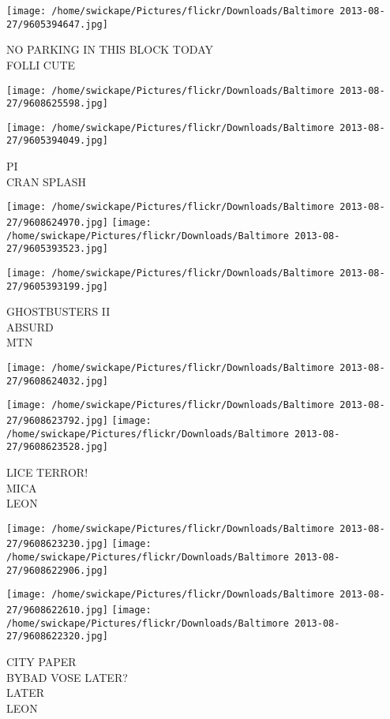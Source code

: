 \documentclass[10pt,letterpaper]{article}
\begin{document}
\vspace{0.25in}
\texttt{[image: /home/swickape/Pictures/flickr/Downloads/Baltimore 2013-08-27/9605394647.jpg]}

NO PARKING IN THIS BLOCK TODAY\\
FOLLI CUTE
\pagebreak

\texttt{[image: /home/swickape/Pictures/flickr/Downloads/Baltimore 2013-08-27/9608625598.jpg]}

\vspace{0.25in}
\texttt{[image: /home/swickape/Pictures/flickr/Downloads/Baltimore 2013-08-27/9605394049.jpg]}

PI\\
CRAN SPLASH
\pagebreak

\texttt{[image: /home/swickape/Pictures/flickr/Downloads/Baltimore 2013-08-27/9608624970.jpg]}
\texttt{[image: /home/swickape/Pictures/flickr/Downloads/Baltimore 2013-08-27/9605393523.jpg]}

\texttt{[image: /home/swickape/Pictures/flickr/Downloads/Baltimore 2013-08-27/9605393199.jpg]}

GHOSTBUSTERS II\\
ABSURD\\
MTN
\pagebreak

\texttt{[image: /home/swickape/Pictures/flickr/Downloads/Baltimore 2013-08-27/9608624032.jpg]}

\vspace{0.25in}
\texttt{[image: /home/swickape/Pictures/flickr/Downloads/Baltimore 2013-08-27/9608623792.jpg]}
\texttt{[image: /home/swickape/Pictures/flickr/Downloads/Baltimore 2013-08-27/9608623528.jpg]}

LICE TERROR!\\
MICA\\
LEON
\pagebreak

\texttt{[image: /home/swickape/Pictures/flickr/Downloads/Baltimore 2013-08-27/9608623230.jpg]}
\texttt{[image: /home/swickape/Pictures/flickr/Downloads/Baltimore 2013-08-27/9608622906.jpg]}

\texttt{[image: /home/swickape/Pictures/flickr/Downloads/Baltimore 2013-08-27/9608622610.jpg]}
\texttt{[image: /home/swickape/Pictures/flickr/Downloads/Baltimore 2013-08-27/9608622320.jpg]}

CITY PAPER\\
BYBAD VOSE LATER?\\
LATER\\
LEON
\pagebreak
\end{document}
